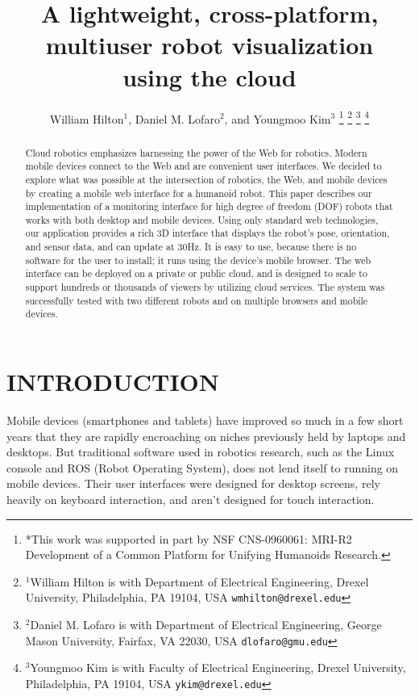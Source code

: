 \documentclass[letterpaper, 10 pt, conference]{ieee/ieeeconf}  %
\title{\LARGE \bf
A lightweight, cross-platform, multiuser robot visualization \\ using the cloud
}
\author{William Hilton$^{1}$, Daniel M. Lofaro$^{2}$, and Youngmoo Kim$^{3}$%
\thanks{*This work was supported in part by NSF CNS-0960061: MRI-R2 Development of a Common Platform for Unifying Humanoids Research.}%
\thanks{$^{1}$William Hilton is with Department of Electrical Engineering, Drexel University,
        Philadelphia, PA 19104, USA
        {\tt\small wmhilton@drexel.edu}}%
\thanks{$^{2}$Daniel M. Lofaro is with Department of Electrical Engineering, George Mason University,
        Fairfax, VA 22030, USA
        {\tt\small dlofaro@gmu.edu}}%
\thanks{$^{3}$Youngmoo Kim is with Faculty of Electrical Engineering, Drexel University,
        Philadelphia, PA 19104, USA
        {\tt\small ykim@drexel.edu}}%
}
\begin{document}
\maketitle
\thispagestyle{empty}
\pagestyle{empty}






\begin{abstract}
Cloud robotics emphasizes harnessing the power of the Web for robotics.
Modern mobile devices connect to the Web and are convenient user interfaces.
We decided to explore what was possible at the intersection of robotics, the Web, and mobile devices by creating a mobile web interface for a humanoid robot.
This paper describes our implementation of a monitoring interface for high degree of freedom (DOF) robots that works with both desktop and mobile devices.
Using only standard web technologies, our application provides a rich 3D interface that displays the robot's pose, orientation, and sensor data, and can update at 30Hz.
It is easy to use, because there is no software for the user to install; it runs using the device's mobile browser.
The web interface can be deployed on a private or public cloud, and is designed to scale to support hundreds or thousands of viewers by utilizing cloud services.
The system was successfully tested with two different robots and on multiple browsers and mobile devices.
\end{abstract}


\section{INTRODUCTION}
Mobile devices (smartphones and tablets) have improved so much in a few short years that they are rapidly encroaching on niches previously held by laptops and desktops.
But traditional software used in robotics research, such as the Linux console and ROS (Robot Operating System), does not lend itself to running on mobile devices.
Their user interfaces were designed for desktop screens, rely heavily on keyboard interaction, and aren't designed for touch interaction.
\end{document}
